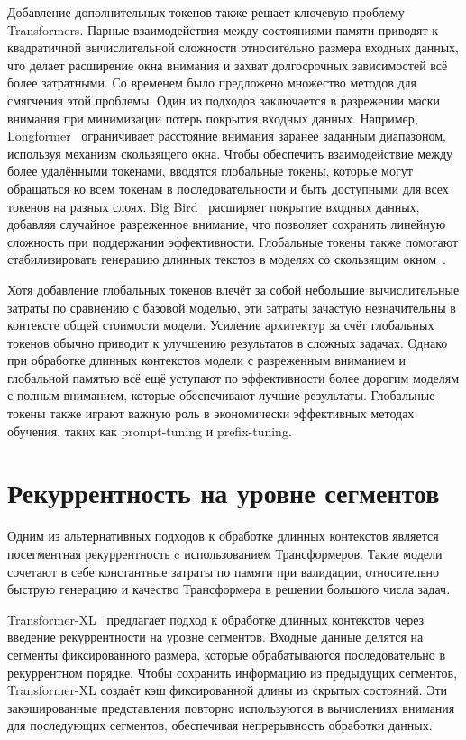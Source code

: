 Добавление дополнительных токенов также решает ключевую проблему Transformers. Парные взаимодействия между состояниями памяти приводят к квадратичной вычислительной сложности относительно размера входных данных, что делает расширение окна внимания и захват долгосрочных зависимостей всё более затратными. Со временем было предложено множество методов для смягчения этой проблемы. Один из подходов заключается в разрежении маски внимания при минимизации потерь покрытия входных данных. Например, Longformer~\cite{beltagy2020longformer} ограничивает расстояние внимания заранее заданным диапазоном, используя механизм скользящего окна. Чтобы обеспечить взаимодействие между более удалёнными токенами, вводятся глобальные токены, которые могут обращаться ко всем токенам в последовательности и быть доступными для всех токенов на разных слоях. Big Bird~\cite{zaheer2020big} расширяет покрытие входных данных, добавляя случайное разреженное внимание, что позволяет сохранить линейную сложность при поддержании эффективности. Глобальные токены также помогают стабилизировать генерацию длинных текстов в моделях со скользящим окном~\cite{xiao2023efficient}.  

Хотя добавление глобальных токенов влечёт за собой небольшие вычислительные затраты по сравнению с базовой моделью, эти затраты зачастую незначительны в контексте общей стоимости модели. Усиление архитектур за счёт глобальных токенов обычно приводит к улучшению результатов в сложных задачах. Однако при обработке длинных контекстов модели с разреженным вниманием и глобальной памятью всё ещё уступают по эффективности более дорогим моделям с полным вниманием, которые обеспечивают лучшие результаты. Глобальные токены также играют важную роль в экономически эффективных методах обучения, таких как prompt-tuning и prefix-tuning.  

\section{Рекуррентность на уровне сегментов}

Одним из альтернативных подходов к обработке длинных контекстов является посегментная рекуррентность c использованием Трансформеров. Такие модели сочетают в себе константные затраты по памяти при валидации, относительно быструю генерацию и качество Трансформера в решении большого числа задач. 

Transformer-XL~\cite{dai2019transformerxl} предлагает подход к обработке длинных контекстов через введение рекуррентности на уровне сегментов. Входные данные делятся на сегменты фиксированного размера, которые обрабатываются последовательно в рекуррентном порядке. Чтобы сохранить информацию из предыдущих сегментов, Transformer-XL создаёт кэш фиксированной длины из скрытых состояний. Эти закэшированные представления повторно используются в вычислениях внимания для последующих сегментов, обеспечивая непрерывность обработки данных.  

